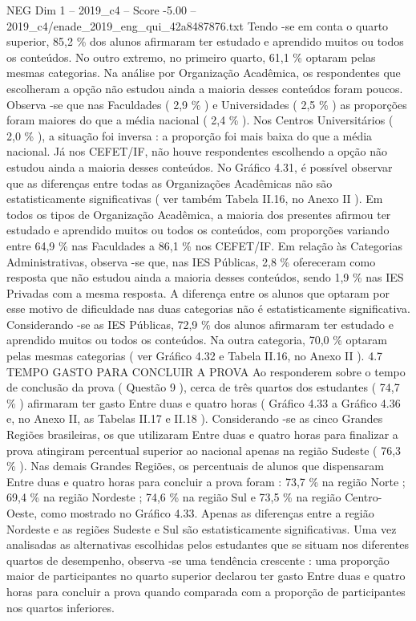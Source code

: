 \begin{textsample}{NEG Dim 1 – 2019\_c4 – Score -5.00 – 2019\_c4/enade\_2019\_eng\_qui\_42a8487876.txt}
Tendo -se em conta o quarto superior, 85,2 \% dos alunos afirmaram ter estudado e aprendido muitos ou todos os conteúdos.
No outro extremo, no primeiro quarto, 61,1 \% optaram pelas mesmas categorias.
Na análise por Organização Acadêmica, os respondentes que escolheram a opção não estudou ainda a maioria desses conteúdos foram poucos.
Observa -se que nas Faculdades ( 2,9 \% ) e Universidades ( 2,5 \% ) as proporções foram maiores do que a média nacional ( 2,4 \% ).
Nos Centros Universitários ( 2,0 \% ), a situação foi inversa : a proporção foi mais baixa do que a média nacional.
Já nos CEFET/IF, não houve respondentes escolhendo a opção não estudou ainda a maioria desses conteúdos.
No Gráfico 4.31, é possível observar que as diferenças entre todas as Organizações Acadêmicas não são estatisticamente significativas ( ver também Tabela II.16, no Anexo II ).
Em todos os tipos de Organização Acadêmica, a maioria dos presentes afirmou ter estudado e aprendido muitos ou todos os conteúdos, com proporções variando entre 64,9 \% nas Faculdades a 86,1 \% nos CEFET/IF.
Em relação às Categorias Administrativas, observa -se que, nas IES Públicas, 2,8 \% ofereceram como resposta que não estudou ainda a maioria desses conteúdos, sendo 1,9 \% nas IES Privadas com a mesma resposta.
A diferença entre os alunos que optaram por esse motivo de dificuldade nas duas categorias não é estatisticamente significativa.
Considerando -se as IES Públicas, 72,9 \% dos alunos afirmaram ter estudado e aprendido muitos ou todos os conteúdos.
Na outra categoria, 70,0 \% optaram pelas mesmas categorias ( ver Gráfico 4.32 e Tabela II.16, no Anexo II ). 4.7 TEMPO GASTO PARA CONCLUIR A PROVA Ao responderem sobre o tempo de conclusão da prova ( Questão 9 ), cerca de três quartos dos estudantes ( 74,7 \% ) afirmaram ter gasto Entre duas e quatro horas ( Gráfico 4.33 a Gráfico 4.36 e, no Anexo II, as Tabelas II.17 e II.18 ).
Considerando -se as cinco Grandes Regiões brasileiras, os que utilizaram Entre duas e quatro horas para finalizar a prova atingiram percentual superior ao nacional apenas na região Sudeste ( 76,3 \% ).
Nas demais Grandes Regiões, os percentuais de alunos que dispensaram Entre duas e quatro horas para concluir a prova foram : 73,7 \% na região Norte ; 69,4 \% na região Nordeste ; 74,6 \% na região Sul e 73,5 \% na região Centro-Oeste, como mostrado no Gráfico 4.33.
Apenas as diferenças entre a região Nordeste e as regiões Sudeste e Sul são estatisticamente significativas.
Uma vez analisadas as alternativas escolhidas pelos estudantes que se situam nos diferentes quartos de desempenho, observa -se uma tendência crescente : uma proporção maior de participantes no quarto superior declarou ter gasto Entre duas e quatro horas para concluir a prova quando comparada com a proporção de participantes nos quartos inferiores.

\end{textsample}
